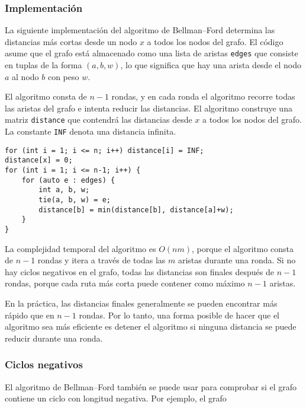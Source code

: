 \subsubsection{Implementación}

La siguiente implementación del
algoritmo de Bellman–Ford determina las distancias más cortas
desde un nodo $x$ a todos los nodos del grafo.
El código asume que el grafo está almacenado
como una lista de aristas \texttt{edges}
que consiste en tuplas de la forma $(a,b,w)$,
lo que significa que hay una arista desde el nodo $a$ al nodo $b$
con peso $w$.

El algoritmo consta de $n-1$ rondas,
y en cada ronda el algoritmo recorre
todas las aristas del grafo e intenta
reducir las distancias.
El algoritmo construye una matriz \texttt{distance}
que contendrá las distancias desde $x$
a todos los nodos del grafo.
La constante \texttt{INF} denota una distancia infinita.

\begin{lstlisting}
for (int i = 1; i <= n; i++) distance[i] = INF;
distance[x] = 0;
for (int i = 1; i <= n-1; i++) {
    for (auto e : edges) {
        int a, b, w;
        tie(a, b, w) = e;
        distance[b] = min(distance[b], distance[a]+w);
    }
}
\end{lstlisting}

La complejidad temporal del algoritmo es $O(nm)$,
porque el algoritmo consta de $n-1$ rondas y
itera a través de todas las $m$ aristas durante una ronda.
Si no hay ciclos negativos en el grafo,
todas las distancias son finales después de $n-1$ rondas,
porque cada ruta más corta puede contener como máximo $n-1$ aristas.

En la práctica, las distancias finales generalmente
se pueden encontrar más rápido que en $n-1$ rondas.
Por lo tanto, una forma posible de hacer que el algoritmo sea más eficiente
es detener el algoritmo si ninguna distancia
se puede reducir durante una ronda.

\subsubsection{Ciclos negativos}


El algoritmo de Bellman–Ford también se puede usar para
comprobar si el grafo contiene un ciclo con longitud negativa.
Por ejemplo, el grafo

